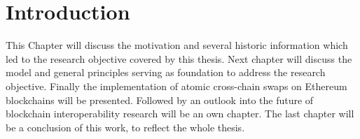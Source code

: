 %
%
\chapter{Introduction}
\label{ch:intro}
This Chapter will discuss the motivation and several historic information which led to the research objective covered by this thesis. Next chapter will discuss the model and general principles serving as foundation to address the research objective. Finally the implementation of atomic cross-chain swaps on Ethereum blockchains will be presented. Followed by an outlook into the future of blockchain interoperability research will be an own chapter. The last chapter will be a conclusion of this work, to reflect the whole thesis.

%
%
